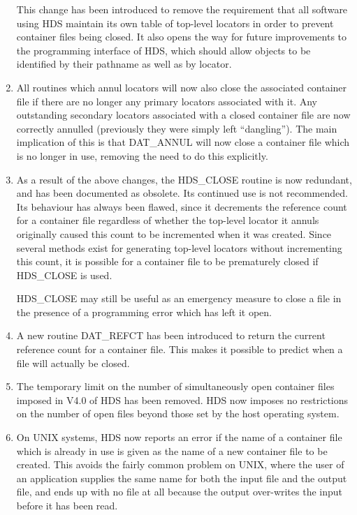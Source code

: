 \begin{enumerate}
This change has been introduced to remove the requirement that all software
using HDS maintain its own table of top-level locators in order to prevent
container files being closed. It also opens the way for future improvements to
the programming interface of HDS, which should allow objects to be identified by
their pathname as well as by locator.

\item
All routines which annul locators will now also close the associated container
file if there are no longer any primary locators associated with it. Any
outstanding secondary locators associated with a closed container file are now
correctly annulled (previously they were simply left ``dangling''). The main
implication of this is that DAT\_ANNUL will now close a container file which
is no longer in use, removing the need to do this explicitly.

\item
As a result of the above changes, the HDS\_CLOSE routine is now redundant, and
has been documented as obsolete. Its continued use is not recommended. Its
behaviour has always been flawed, since it decrements the reference count for a
container file regardless of whether the top-level locator it annuls originally
caused this count to be incremented when it was created. Since several methods
exist for generating top-level locators without incrementing this count, it is
possible for a container file to be prematurely closed if HDS\_CLOSE is used.

HDS\_CLOSE may still be useful as an emergency measure to close a file in the
presence of a programming error which has left it open.

\item
A new routine DAT\_REFCT has been introduced to return the current reference
count for a container file. This makes it possible to predict when a file will
actually be closed.

\item
The temporary limit on the number of simultaneously open container files imposed
in V4.0 of HDS has been removed. HDS now imposes no restrictions on the number
of open files beyond those set by the host operating system.

\item
On UNIX systems, HDS now reports an error if the name of a container file which
is already in use is given as the name of a new container file to be created.
This avoids the fairly common problem on UNIX, where the user of an application
supplies the same name for both the input file and the output file, and ends up
with no file at all because the output over-writes the input before it has been
read.


\end{enumerate}

